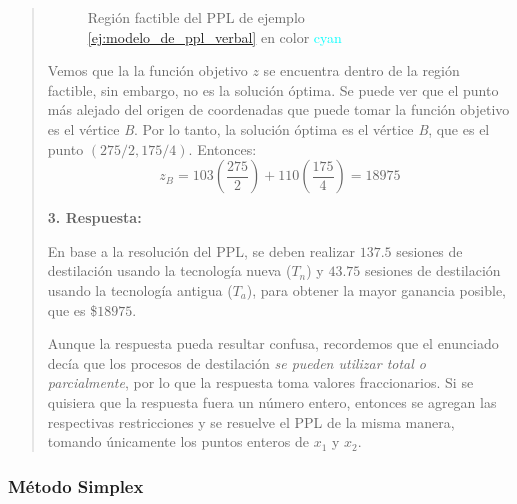 \begin{quote}
\begin{figure}[ht]
    \caption{Región factible del PPL de ejemplo \ref{ej:modelo_de_ppl_verbal} en color \textcolor{cyan}{cyan}}
    \label{fig:ppl-maximizacion}
  \end{figure}
  Vemos que la la función objetivo \(z\) se encuentra dentro de la región factible, sin embargo, no es la solución óptima. Se puede ver que el punto más alejado del origen de coordenadas que puede tomar la función objetivo es el vértice \textit{B}. Por lo tanto, la solución óptima es el vértice \textit{B}, que es el punto \(\left(275/2,175/4\right)\). Entonces:
  \[
    z_B = 103\left(\frac{275}{2}\right) + 110\left(\frac{175}{4}\right) = \boxed{18975}
  \]

  \textbf{3. Respuesta:}

  En base a la resolución del PPL, se deben realizar \(137.5\) sesiones de destilación usando la tecnología nueva (\(T_n\)) y \(43.75\) sesiones de destilación usando la tecnología antigua (\(T_a\)), para obtener la mayor ganancia posible, que es \$\(18975\).

  \begin{tcolorbox}[remember]
    Aunque la respuesta pueda resultar confusa, recordemos que el enunciado decía que los procesos de destilación \textit{se pueden utilizar total o parcialmente}, por lo que la respuesta toma valores fraccionarios. Si se quisiera que la respuesta fuera un número entero, entonces se agregan las respectivas restricciones y se resuelve el PPL de la misma manera, tomando únicamente los puntos enteros de \(x_1\) y \(x_2\).
  \end{tcolorbox}

\end{quote}

\subsubsection{Método Simplex}

